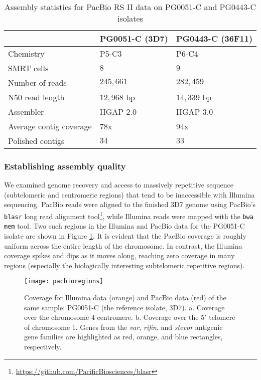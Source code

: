 \begin{table}[]
\centering
\caption{Assembly statistics for PacBio RS II data on PG0051-C and PG0443-C isolates}
\label{tbl:asmstatspacbio}
\begin{tabular}{@{}lll@{}}
\toprule
                        & PG0051-C (3D7)   & PG0443-C (36F11)   \\ \midrule
Chemistry               & P5-C3            & P6-C4              \\
SMRT cells              & $8$              & $9$                \\
Number of reads         & $245,661$        & $282,459$          \\
N50 read length         & $12,968$ bp      & $14,339$ bp        \\
Assembler               & HGAP $2.0$       & HGAP $3.0$         \\
Average contig coverage & $78$x            & $94$x              \\
Polished contigs        & $34$             & $33$               \\ \bottomrule
\end{tabular}
\end{table}

\subsubsection{Establishing assembly quality}
We examined genome recovery and access to massively repetitive sequence (subtelomeric and centromeric regions) that tend to be inaccessible with Illumina sequencing.  PacBio reads were aligned to the finished 3D7 genome using PacBio's \texttt{blasr} long read alignment tool\footnote{\url{https://github.com/PacificBiosciences/blasr}}, while Illumina reads were mapped with the \texttt{bwa mem} tool.  Two such regions in the Illumina and PacBio data for the PG0051-C isolate are shown in Figure \ref{fig:pacbioregions}.  It is evident that the PacBio coverage is roughly uniform across the entire length of the chromosome. In contrast, the Illumina coverage spikes and dips as it moves along, reaching zero coverage in many regions (especially the biologically interesting subtelomeric repetitive regions).

\begin{figure}[h!]
  \centering
    \texttt{[image: pacbioregions]}
  \caption{Coverage for Illumina data (orange) and PacBio data (red) of the same sample: PG0051-C (the reference isolate, 3D7).  a. Coverage over the chromosome $4$ centromere.  b. Coverage over the $5'$ telomere of chromosome $1$.  Genes from the \textit{var}, \textit{rifin}, and \textit{stevor} antigenic gene families are highlighted as red, orange, and blue rectangles, respectively.}
  \label{fig:pacbioregions}
\end{figure}


